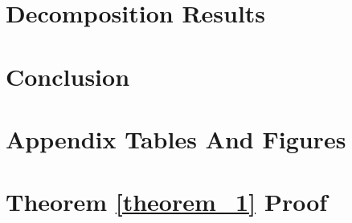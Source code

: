 \documentclass[12pt]{article}
\begin{document}
\section{Decomposition Results\label{sec:empirics}}


% 

\section{Conclusion\label{sec:conclusion}}




\clearpage
\begin{singlespace}
% 
% 
% 


\end{singlespace}


\newpage
\appendix
\setcounter{table}{0}
\renewcommand{\tablename}{Appendix Table}
\renewcommand{\figurename}{Appendix Figure}
\renewcommand{\thetable}{A\arabic{table}}
\setcounter{figure}{0}
\renewcommand{\thefigure}{A\arabic{figure}}
\renewcommand{\theequation}{\Alph{section}\arabic{equation}}


\section{Appendix Tables And Figures}







\newpage 
\section{Theorem \ref{theorem_1} Proof \label{sec:appendix:first}}
\renewcommand{\thetable}{B\arabic{table}}
\setcounter{table}{0}
\renewcommand{\thefigure}{B\arabic{figure}}
\setcounter{figure}{0}



% 


\printbibliography
\end{document}

